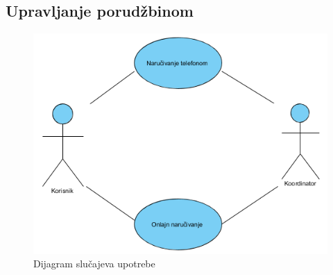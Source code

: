 \subsection{Upravljanje porudžbinom}

 \begin{figure}[!h]
    \includegraphics[width=1\textwidth]{slike/Upravljanje_porudzbinomUC.png}
    \caption{Dijagram slučajeva upotrebe} %
    \label{fig:slika_deaktiviranje}
\end{figure}



 \newpage


